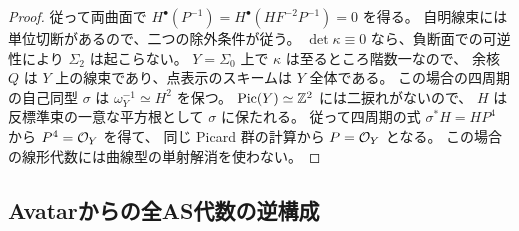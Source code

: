 \begin{proof}
従って両曲面で
$H^\bullet(P^{-1})=H^\bullet(HF^{-2}P^{-1})=0$ を得る。
自明線束には単位切断があるので、二つの除外条件が従う。
$\det\kappa\equiv0$ なら、負断面での可逆性により
$\Sigma_2$ は起こらない。
$Y=\Sigma_0$ 上で $\kappa$ は至るところ階数一なので、
余核 $Q$ は $Y$ 上の線束であり、点表示のスキームは $Y$ 全体である。
この場合の四周期の自己同型 $\sigma$ は
$\omega_Y^{-1}\simeq H^2$ を保つ。
$\operatorname{Pic}(Y)\simeq\mathbb Z^2$ には二捩れがないので、
$H$ は反標準束の一意な平方根として $\sigma$ に保たれる。
従って四周期の式 $\sigma^*H=HP^4$ から $P^4=\mathcal O_Y$ を得て、
同じ Picard 群の計算から $P=\mathcal O_Y$ となる。
この場合の線形代数には曲線型の単射解消を使わない。
\end{proof}


\subsection{Avatarからの全AS代数の逆構成}
\label{subsec:qa-as-avatar-inverse}

